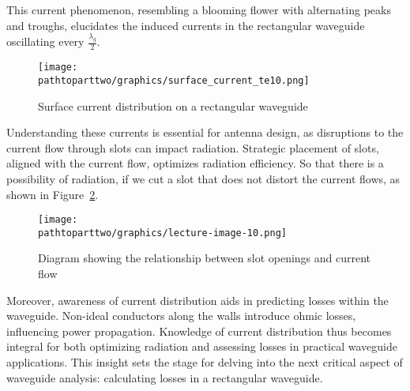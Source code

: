 
	
This current phenomenon, resembling a blooming flower with alternating peaks and troughs, elucidates the induced currents in the rectangular waveguide oscillating every $\frac{\lambda_g}{2}$.
\begin{figure}[h]
\centering
\texttt{[image: \\pathtoparttwo/graphics/surface\_current\_te10.png]}
\caption{Surface current distribution on a rectangular waveguide}
\label{fig:surface_current_te10}
\end{figure}

Understanding these currents is essential for antenna design, as disruptions to the current flow through slots can impact radiation. Strategic placement of slots, aligned with the current flow, optimizes radiation efficiency.  So that there is a possibility of radiation, if we cut a slot that does not distort the current flows, as shown in Figure~\ref{fig:lectureimage10}.
\begin{figure}[h]
\centering
\texttt{[image: \\pathtoparttwo/graphics/lecture-image-10.png]}
\caption{Diagram showing the relationship between slot openings and current flow}
\label{fig:lectureimage10}
\end{figure}

Moreover, awareness of current distribution aids in predicting losses within the waveguide. Non-ideal conductors along the walls introduce ohmic losses, influencing power propagation. Knowledge of current distribution thus becomes integral for both optimizing radiation and assessing losses in practical waveguide applications. This insight sets the stage for delving into the next critical aspect of waveguide analysis: calculating losses in a rectangular waveguide.


